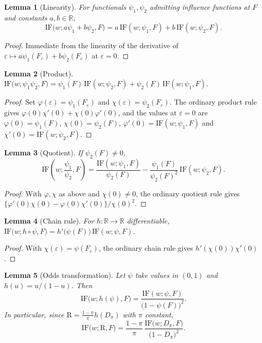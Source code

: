 \documentclass[11pt]{article}
\theoremstyle{plain}
\newtheorem{lem}{Lemma}
\theoremstyle{definition}
\theoremstyle{remark}
\newcommand{\R}{\mathbb{R}}
\newcommand{\ratio}{\ensuremath{\pi}}
\newcommand{\contrast}{D_{\ratio}}
\newcommand{\DensityRatio}{\text{R}}
\newcommand{\IF}{\mathrm{IF}}
\begin{document}
\begin{lem}[Linearity]
\label{lem:sum}
For functionals $\psi_1,\psi_2$ admitting influence functions at $F$ and constants
$a,b \in \R$,
\[
\IF\big(w; a\psi_1 + b\psi_2, F\big)
= a\,\IF(w;\psi_1,F) + b\,\IF(w;\psi_2,F).
\]
\end{lem}

\begin{proof}
Immediate from the linearity of the derivative of
$\varepsilon \mapsto a\psi_1(F_\varepsilon) + b\psi_2(F_\varepsilon)$ at
$\varepsilon = 0$.
\end{proof}

\begin{lem}[Product]
\label{lem:product}
$\IF\big(w;\psi_1\psi_2,F\big)
= \psi_1(F)\,\IF(w;\psi_2,F) + \psi_2(F)\,\IF(w;\psi_1,F)$.
\end{lem}

\begin{proof}
Set $\varphi(\varepsilon) = \psi_1(F_\varepsilon)$ and
$\chi(\varepsilon) = \psi_2(F_\varepsilon)$. The ordinary product rule gives
$\varphi(0)\chi'(0) + \chi(0)\varphi'(0)$, and the values at $\varepsilon = 0$ are
$\varphi(0) = \psi_1(F)$, $\chi(0) = \psi_2(F)$, $\varphi'(0) = \IF(w;\psi_1,F)$ and
$\chi'(0) = \IF(w;\psi_2,F)$.
\end{proof}

\begin{lem}[Quotient]
\label{lem:quotient}
If $\psi_2(F) \neq 0$,
\[
\IF\!\left(w;\frac{\psi_1}{\psi_2},F\right)
= \frac{\IF(w;\psi_1,F)}{\psi_2(F)}
- \frac{\psi_1(F)}{\psi_2(F)^2}\,\IF(w;\psi_2,F).
\]
\end{lem}

\begin{proof}
With $\varphi,\chi$ as above and $\chi(0) \neq 0$, the ordinary quotient rule gives
$\{\varphi'(0)\chi(0) - \varphi(0)\chi'(0)\}/\chi(0)^2$.
\end{proof}

\begin{lem}[Chain rule]
\label{lem:chain}
For $h : \R \to \R$ differentiable,
$\IF\big(w;h \circ \psi,F\big) = h'\big(\psi(F)\big)\,\IF(w;\psi,F)$.
\end{lem}

\begin{proof}
With $\chi(\varepsilon) = \psi(F_\varepsilon)$, the ordinary chain rule gives
$h'(\chi(0))\chi'(0)$.
\end{proof}

\begin{lem}[Odds transformation]
\label{lem:odds}
Let $\psi$ take values in $(0,1)$ and $h(u) = u/(1-u)$. Then
\[
\IF\big(w;h(\psi),F\big) = \frac{\IF(w;\psi,F)}{\big(1-\psi(F)\big)^2} .
\]
In particular, since $\DensityRatio = \frac{1-\ratio}{\ratio} h(\contrast)$ with
$\ratio$ constant,
\begin{equation}
\IF\big(w;\DensityRatio,F\big)
= \frac{1-\ratio}{\ratio}\,
\frac{\IF\big(w;\contrast,F\big)}{\big(1-\contrast\big)^{2}} .
\label{eq:app-if-R}
\end{equation}
\end{lem}
\end{document}
